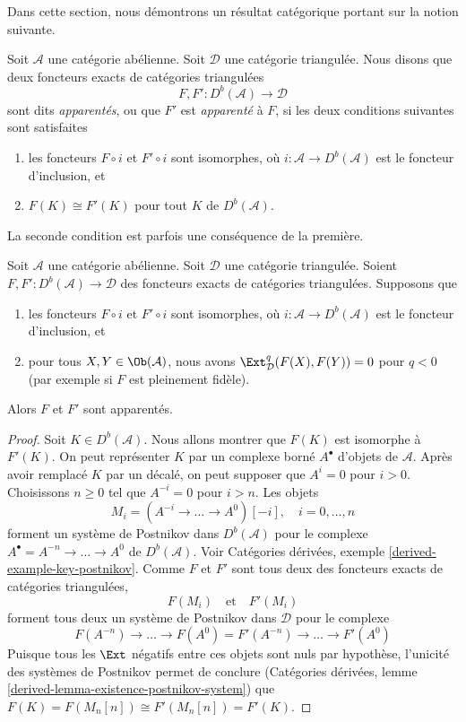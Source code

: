 \noindent
Dans cette section, nous démontrons un résultat catégorique portant sur la notion suivante.

\begin{definition}
\label{definition-siblings}
Soit $\mathcal{A}$ une catégorie abélienne. Soit $\mathcal{D}$ une
catégorie triangulée. Nous disons que deux foncteurs exacts de catégories triangulées
$$
F, F' : D^b(\mathcal{A}) \longrightarrow \mathcal{D}
$$
sont dits {\it apparentés}, ou que $F'$ est {\it apparenté} à $F$,
si les deux conditions suivantes sont satisfaites
\begin{enumerate}
\item les foncteurs $F \circ i$ et $F' \circ i$ sont isomorphes,
où $i : \mathcal{A} \to D^b(\mathcal{A})$ est le foncteur d'inclusion, et
\item $F(K) \cong F'(K)$ pour tout $K$ de $D^b(\mathcal{A})$.
\end{enumerate}
\end{definition}

\noindent
La seconde condition est parfois une conséquence de la première.

\begin{lemma}
\label{lemma-sibling-fully-faithful}
Soit $\mathcal{A}$ une catégorie abélienne. Soit $\mathcal{D}$ une
catégorie triangulée. Soient
$F, F' : D^b(\mathcal{A}) \longrightarrow \mathcal{D}$
des foncteurs exacts de catégories triangulées. Supposons que
\begin{enumerate}
\item les foncteurs $F \circ i$ et $F' \circ i$ sont isomorphes,
où $i : \mathcal{A} \to D^b(\mathcal{A})$ est le foncteur d'inclusion, et
\item pour tous $X, Y \in \Ob(\mathcal{A})$, nous avons
$\Ext^q_\mathcal{D}(F(X), F(Y)) = 0$ pour $q < 0$ (par exemple
si $F$ est pleinement fidèle).
\end{enumerate}
Alors $F$ et $F'$ sont apparentés.
\end{lemma}

\begin{proof}
Soit $K \in D^b(\mathcal{A})$. Nous allons montrer que $F(K)$ est isomorphe à $F'(K)$.
On peut représenter $K$ par un complexe borné $A^\bullet$ d'objets de
$\mathcal{A}$. Après avoir remplacé $K$ par un décalé, on peut
supposer que $A^i = 0$ pour $i > 0$. Choisissons $n \geq 0$ tel que $A^{-i} = 0$
pour $i > n$. Les objets
$$
M_i = (A^{-i} \to \ldots \to A^0)[-i],\quad i = 0, \ldots, n
$$
forment un système de Postnikov dans $D^b(\mathcal{A})$ pour le complexe
$A^\bullet = A^{-n} \to \ldots \to A^0$ de $D^b(\mathcal{A})$.
Voir Catégories dérivées, exemple \ref{derived-example-key-postnikov}.
Comme $F$ et $F'$ sont tous deux des foncteurs exacts de catégories triangulées,
$$
F(M_i)
\quad\text{et}\quad
F'(M_i)
$$
forment tous deux un système de Postnikov dans $\mathcal{D}$ pour le complexe
$$
F(A^{-n}) \to \ldots \to F(A^0) =
F'(A^{-n}) \to \ldots \to F'(A^0)
$$
Puisque tous les $\Ext$ négatifs entre ces objets sont nuls par hypothèse,
l'unicité des systèmes de Postnikov permet de conclure
(Catégories dérivées, lemme \ref{derived-lemma-existence-postnikov-system})
que $F(K) = F(M_n[n]) \cong F'(M_n[n]) = F'(K)$.
\end{proof}

